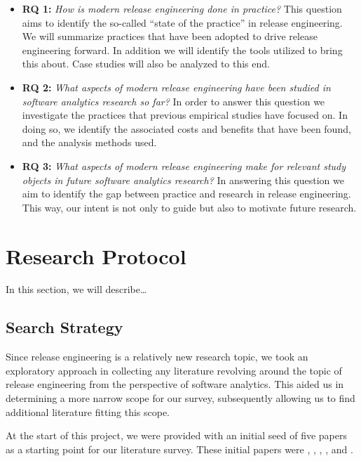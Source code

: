 \documentclass[]{book}
\begin{document}
\begin{itemize}
\item
  \textbf{RQ 1:} \emph{How is modern release engineering done in
  practice?} This question aims to identify the so-called ``state of the
  practice'' in release engineering. We will summarize practices that
  have been adopted to drive release engineering forward. In addition we
  will identify the tools utilized to bring this about. Case studies
  will also be analyzed to this end.
\item
  \textbf{RQ 2:} \emph{What aspects of modern release engineering have
  been studied in software analytics research so far?} In order to
  answer this question we investigate the practices that previous
  empirical studies have focused on. In doing so, we identify the
  associated costs and benefits that have been found, and the analysis
  methods used.
\item
  \textbf{RQ 3:} \emph{What aspects of modern release engineering make
  for relevant study objects in future software analytics research?} In
  answering this question we aim to identify the gap between practice
  and research in release engineering. This way, our intent is not only
  to guide but also to motivate future research.
\end{itemize}

\section{Research Protocol}\label{research-protocol-3}

In this section, we will describe\ldots{}

\subsection{Search Strategy}\label{search-strategy}

Since release engineering is a relatively new research topic, we took an
exploratory approach in collecting any literature revolving around the
topic of release engineering from the perspective of software analytics.
This aided us in determining a more narrow scope for our survey,
subsequently allowing us to find additional literature fitting this
scope.

At the start of this project, we were provided with an initial seed of
five papers as a starting point for our literature survey. These initial
papers were \citet{adams2016a}, \citet{da2016a}, \citet{d2014a},
\citet{khomh2012a}, and \citet{khomh2015a}.
\end{document}
